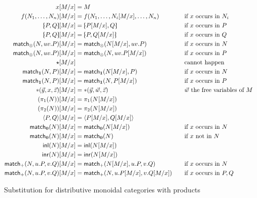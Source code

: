 \documentclass{book}
\def\ttt{\mathord{\ast}}%
\def\pair#1#2{\langle #1,#2\rangle}
\def\inl{\mathsf{inl}}
\def\inr{\mathsf{inr}}
\def\case{\mathsf{match}_+}
\def\match{\mathsf{match}}
\def\zero{\mathbf{0}}
\def\abort{\match_{\zero}}
\def\one{\mathbf{1}}
\def\ott{\mathord{\star}}%
\let\tensor\otimes
\def\tpair#1#2{\text{\textlquill} #1,#2 \text{\textrquill}}%
\begin{document}
\begin{figure}
  \centering
  \begin{alignat*}{2}
    x[M/x] &= M\\
    f(N_1,\dots,N_n)[M/x] &= f(N_1,\dots,N_i[M/x],\dots,N_n) &&\quad\text{if $x$ occurs in $N_i$}\\
    \tpair P Q[M/x] &= \tpair{P[M/x]}{Q} &&\quad\text{if $x$ occurs in $P$}\\
    \tpair P Q[M/x] &= \tpair{P}{Q[M/x]} &&\quad\text{if $x$ occurs in $Q$}\\
    \match_\tensor(N,uv.P)[M/x] &= \match_\tensor(N[M/x],uv.P) &&\quad\text{if $x$ occurs in $N$}\\
    \match_\tensor(N,uv.P)[M/x] &= \match_\tensor(N,uv.P[M/x]) &&\quad\text{if $x$ occurs in $P$}\\
    \ott[M/x] &&&\quad\text{cannot happen}\\
    \match_\one(N,P)[M/x] &= \match_\one(N[M/x],P) &&\quad\text{if $x$ occurs in $N$}\\
    \match_\one(N,P)[M/x] &= \match_\one(N,P[M/x]) &&\quad\text{if $x$ occurs in $P$}\\
    \ttt(\vec y,x,\vec z)[M/x] &= \ttt(\vec y,\vec w, \vec z) &&\quad\text{$\vec w$ the free variables of $M$}\\
    (\pi_1(N))[M/x] &= \pi_1(N[M/x])\\
    (\pi_2(N))[M/x] &= \pi_2(N[M/x])\\
    \pair{P}{Q}[M/x] &= \pair{P[M/x]}{Q[M/x]}\\
    \abort(N)[M/x] &= \abort(N[M/x]) &&\quad\text{if $x$ occurs in $N$}\\
    \abort(N)[M/x] &= \abort(N) &&\quad\text{if $x$ not in $N$}\\
    \inl(N)[M/x] &= \inl(N[M/x])\\
    \inr(N)[M/x] &= \inr(N[M/x])\\
    \case(N,u.P,v.Q)[M/x] &= \case(N[M/x],u.P,v.Q) &&\quad\text{if $x$ occurs in $N$}\\
    \case(N,u.P,v.Q)[M/x] &= \case(N,u.P[M/x],v.Q[M/x]) &&\quad\text{if $x$ occurs in $P,Q$}
  \end{alignat*}
  \caption{Substitution for distributive monoidal categories with products}
  \label{fig:moncat-prod-coprod-sub}
\end{figure}
\end{document}
